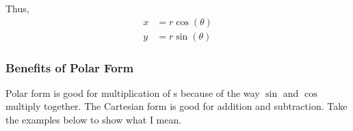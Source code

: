 Thus,
\begin{equation}\label{eq:Convert_Cartesian_Polar}
  \begin{aligned}
    x &= r \cos(\theta) \\
    y &= r \sin(\theta)
  \end{aligned}
\end{equation}

\subsubsection{Benefits of Polar Form}\label{subsubsec:Polar_Form_Benefits}
Polar form is good for multiplication of s because of the way $\sin$ and $\cos$ multiply together.
The Cartesian form is good for addition and subtraction.
Take the examples below to show what I mean.


